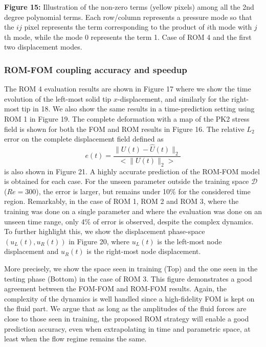 \documentclass[11pt]{article}
\begin{document}
\begin{center}
\textbf{Figure 15:} Illustration of the non-zero terms (yellow pixels) among all the 2nd degree polynomial terms. Each row/column represents a pressure mode so that the $ij$ pixel represents the term corresponding to the product of $i$th mode with $j$th mode, while the mode 0 represents the term 1. Case of ROM 4 and the first two displacement modes.
\end{center}

\subsubsection{ROM-FOM coupling accuracy and speedup}

The ROM 4 evaluation results are shown in Figure 17 where we show the time evolution of the left-most solid tip $x$-displacement, and similarly for the right-most tip in 18. We also show the same results in a time-prediction setting using ROM 1 in Figure 19. The complete deformation with a map of the PK2 stress field is shown for both the FOM and ROM results in Figure 16. The relative $L_2$ error on the complete displacement field defined as
\begin{equation}
\tag{34}
e(t) = \frac{\|U(t) - \hat{U}(t)\|_2}{<\|U(t)\|_2>}
\end{equation}
is also shown in Figure 21. A highly accurate prediction of the ROM-FOM model is obtained for each case. For the unseen parameter outside the training space $\mathcal{D}$ ($Re = 300$), the error is larger, but remains under 10\% for the considered time region. Remarkably, in the case of ROM 1, ROM 2 and ROM 3, where the training was done on a single parameter and where the evaluation was done on an unseen time range, only 4\% of error is observed, despite the complex dynamics. To further highlight this, we show the displacement phase-space $(u_L(t), u_R(t))$ in Figure 20, where $u_L(t)$ is the left-most node displacement and $u_R(t)$ is the right-most node displacement.

More precisely, we show the space seen in training (Top) and the one seen in the testing phase (Bottom) in the case of ROM 3. This figure demonstrates a good agreement between the FOM-FOM and ROM-FOM results. Again, the complexity of the dynamics is well handled since a high-fidelity FOM is kept on the fluid part. We argue that as long as the amplitudes of the fluid forces are close to those seen in training, the proposed ROM strategy will enable a good prediction accuracy, even when extrapolating in time and parametric space, at least when the flow regime remains the same.
\end{document}
